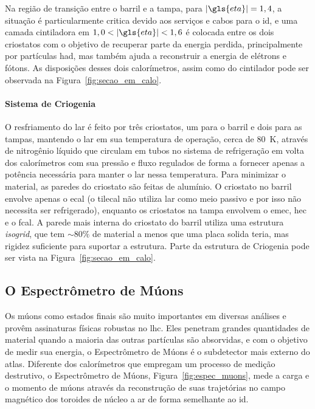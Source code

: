 Na região de transição entre o barril e a tampa, para
$|\gls{eta}| = 1,4$, a situação é particularmente critica devido aos serviços e
cabos para o \gls{id}, e uma camada cintiladora em $1,0<|\gls{eta}|<1,6$ 
é colocada entre os dois criostatos com o objetivo de recuperar parte 
da energia perdida, principalmente por
partículas \gls{had}, mas também ajuda a reconstruir a energia de elétrons e
fótons. As disposições desses dois calorímetros, assim como do cintilador pode 
ser observada na Figura~\ref{fig:secao_em_calo}. 


\paragraph{Sistema de Criogenia}
\label{par:cal_criogenia}

O resfriamento do \gls{lar} é feito por três criostatos, 
um para o barril e dois para as tampas, mantendo o \gls{lar} em sua temperatura
de operação, cerca de 80~K, através de nitrogênio líquido que circulam em tubos
no sistema de refrigeração em volta dos calorímetros com sua pressão e fluxo
regulados de forma a fornecer apenas a potência necessária para manter o
\gls{lar} nessa temperatura. Para minimizar o material, as paredes do criostato
são feitas de alumínio. O criostato no barril envolve apenas o
\gls{ecal} (o \gls{tilecal} não utiliza \gls{lar} como meio passivo e por
isso não necessita ser refrigerado), enquanto os criostatos na tampa envolvem o \gls{emec},
\gls{hec} e o \gls{fcal}. A parede mais interna do criostato do
barril utiliza uma estrutura \emph{isogrid}, que tem $\sim80\%$ de material a
menos que uma placa solida teria, mas rigidez suficiente para suportar a
estrutura. Parte da estrutura de Criogenia pode ser vista na
Figura~\ref{fig:secao_em_calo}.


\subsection{O Espectrômetro de Múons}
\label{ssec:espectometro_muons}

Os múons como estados finais são muito importantes em diversas análises e provêm
assinaturas físicas robustas no \gls{lhc}. 
Eles penetram grandes quantidades de material quando a maioria das outras
partículas são absorvidas, e com o objetivo de medir sua energia, o Espectrômetro
de Múons \cite{muon_tdr} é o subdetector mais externo do \gls{atlas}. Diferente dos calorímetros
que empregam um processo de medição destrutivo, o Espectrômetro de Múons,
Figura~\ref{fig:espec_muons}, mede a carga e o momento de múons através 
da reconstrução de suas trajetórias no 
campo magnético dos toroides de núcleo a ar de forma semelhante ao \gls{id}. 

